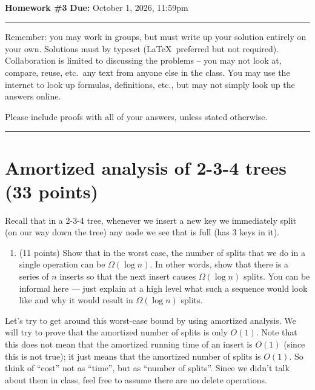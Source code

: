 \documentclass[11pt]{article}
\begin{document}
\\
{{\bf Homework \#3}} \hfill {{\bf Due:} October 1, 2026, 11:59pm} \\
\rule[0.1in]{\textwidth}{0.4pt}

Remember: you may work in groups, but must write up your solution entirely on your own.  Solutions must by typeset (\LaTeX\ preferred but not required).  Collaboration is limited to discussing the problems -- you may not look at, compare, reuse, etc.~any text from anyone else in the class.  You may use the internet to look up formulas, definitions, etc., but may not simply look up the answers online.  

Please include proofs with all of your answers, unless stated otherwise.

\noindent \rule[0.1in]{\textwidth}{0.4pt}

\section{Amortized analysis of 2-3-4 trees (33 points)}

Recall that in a 2-3-4 tree, whenever we insert a new key we immediately split (on our way down the tree) any node we see that is full (has 3 keys in it).  

\begin{enumerate}
\item (11 points) Show that in the worst case, the number of splits that we do in a single operation can be $\Omega(\log n)$.  In other words, show that there is a series of $n$ inserts so that the next insert causes $\Omega(\log n)$ splits.  You can be informal here --- just explain at a high level what such a sequence would look like and why it would result in $\Omega(\log n)$ splits.

\end{enumerate}

Let's try to get around this worst-case bound by using amortized analysis.  We will try to prove that the amortized number of splits is only $O(1)$.  Note that this does not mean that the amortized running time of an insert is $O(1)$ (since this is not true); it just means that the amortized number of splits is $O(1)$.  So think of ``cost'' not as ``time'', but as ``number of splits''.  Since we didn't talk about them in class, feel free to assume there are no delete operations.  
\end{document}
